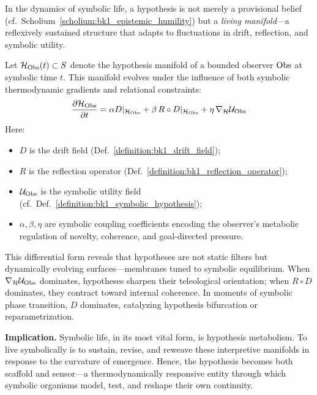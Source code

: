 \begin{scholium} \label{scholium:bk5_hypotheses_as_adaptive_sym}
In the dynamics of symbolic life, a hypothesis is not merely a provisional belief (cf.~Scholium~\ref{scholium:bk1_epistemic_humility}) but a \emph{living manifold}—a reflexively sustained structure that adapts to fluctuations in drift, reflection, and symbolic utility.

Let $\mathcal{H}_{\mathrm{Obs}}(t) \subset S$ denote the hypothesis manifold of a bounded observer $\mathrm{Obs}$ at symbolic time $t$. This manifold evolves under the influence of both symbolic thermodynamic gradients and relational constraints:
\begin{equation}
\frac{\partial \mathcal{H}_{\mathrm{Obs}}}{\partial t} = \alpha D|_{\mathcal{H}_{\mathrm{Obs}}} + \beta \, R \circ D|_{\mathcal{H}_{\mathrm{Obs}}} + \eta \, \nabla_{\mathcal{H}} \mathcal{U}_{\mathrm{Obs}}
\end{equation}
Here:
\begin{itemize}
    \item $D$ is the drift field (Def.~\ref{definition:bk1_drift_field});
    \item $R$ is the reflection operator (Def.~\ref{definition:bk1_reflection_operator});
    \item $\mathcal{U}_{\mathrm{Obs}}$ is the symbolic utility field (cf.~Def.~\ref{definition:bk1_symbolic_hypothesis});
    \item $\alpha, \beta, \eta$ are symbolic coupling coefficients encoding the observer’s metabolic regulation of novelty, coherence, and goal-directed pressure.
\end{itemize}

This differential form reveals that hypotheses are not static filters but dynamically evolving surfaces—membranes tuned to symbolic equilibrium. When $\nabla_{\mathcal{H}} \mathcal{U}_{\mathrm{Obs}}$ dominates, hypotheses sharpen their teleological orientation; when $R \circ D$ dominates, they contract toward internal coherence. In moments of symbolic phase transition, $D$ dominates, catalyzing hypothesis bifurcation or reparametrization.

\textbf{Implication.} Symbolic life, in its most vital form, is hypothesis metabolism. To live symbolically is to sustain, revise, and reweave these interpretive manifolds in response to the curvature of emergence. Hence, the hypothesis becomes both scaffold and sensor—a thermodynamically responsive entity through which symbolic organisms model, test, and reshape their own continuity.
\end{scholium}
